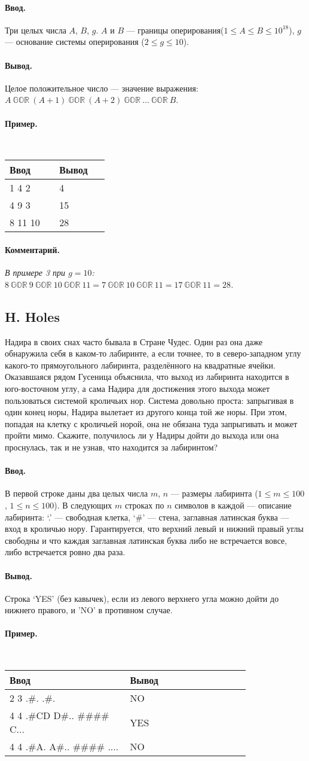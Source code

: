 \documentclass[10pt, a5paper]{article}
\newcommand{\informat}[1]
{
	\paragraph{Ввод.\\} #1
}
\newcommand{\outformat}[1]
{
	\paragraph{Вывод.\\} #1
}
\newcommand{\exampleee}[6]
{
	\paragraph{Пример.\\}
	{\tt
	\begin{tabular}{|p{0.4\linewidth}|p{0.4\linewidth}|}
	\hline
	Ввод 	& Вывод  	\\
	\hline
	#1 		& #2 		\\
	\hline
	#3		& #4		\\
	\hline
	#5		& #6		\\
	\hline
	\end{tabular}
	}
}
\newcommand{\excomm}[1]
{
	\paragraph{Комментарий. \\}
	\textit{#1}
}
\begin{document}
\informat{Три целых числа $A$, $B$, $g$. $A$ и $B$ --- границы оперирования($1 \le A \le B \le 10^{18}$), $g$ --- основание системы оперирования ($2 \le g \le 10$).}

\outformat{Целое положительное число --- значение выражения: \newline $A \ \mathbb{GOR} \ (A+1) \ \mathbb{GOR} \ (A+2) \ \mathbb{GOR} \ \dots \ \mathbb{GOR} \ B$.}

\exampleee{1 4 2}{4}{4 9 3}{15}{8 11 10}{28}

\excomm{В примере 3 при $g = 10$: \newline
$8 \ \mathbb{GOR} \ 9 \ \mathbb{GOR} \ 10 \ \mathbb{GOR} \ 11 = 7 \ \mathbb{GOR} \ 10 \ \mathbb{GOR} \ 11 = 17 \ \mathbb{GOR} \ 11 = 28$.}



\subsection*{H. Holes}

Надира в своих снах часто бывала в Стране Чудес. Один раз она даже обнаружила себя в каком-то лабиринте, а если точнее, то в северо-западном углу какого-то прямоугольного лабиринта, разделённого на квадратные ячейки. Оказавшаяся рядом Гусеница объяснила, что выход из лабиринта находится в юго-восточном углу, а сама Надира для достижения этого выхода может пользоваться системой кроличьих нор. Система довольно проста: запрыгивая в один конец норы, Надира вылетает из другого конца той же норы. При этом, попадая на клетку с кроличьей норой, она не обязана туда запрыгивать и может пройти мимо. Скажите, получилось ли у Надиры дойти до выхода или она проснулась, так и не узнав, что находится за лабиринтом?

\informat{В первой строке даны два целых числа $m$, $n$ --- размеры лабиринта ($1 \le m \le 100$, $1 \le n \le 100$). В следующих $m$ строках по $n$ символов в каждой --- описание лабиринта: ‘.’ --- свободная клетка, ‘\#’ --- стена, заглавная латинская буква --- вход в кроличью нору. Гарантируется, что верхний левый и нижний правый углы свободны и что каждая заглавная латинская буква либо не встречается вовсе, либо встречается ровно два раза.}

\outformat{Строка ‘YES’ (без кавычек), если из левого верхнего угла можно дойти до нижнего правого, и ’NO’ в противном случае.}

\exampleee%
{2 3 \newline
.\#.\newline
.\#.}%
{NO}%
{4 4 \newline
.\#CD \newline
D\#.. \newline
\#\#\#\# \newline
C...}%
{YES}%
{4 4%
.\#A. \newline
A\#.. \newline
\#\#\#\# \newline
....}%
{NO}
\end{document}
